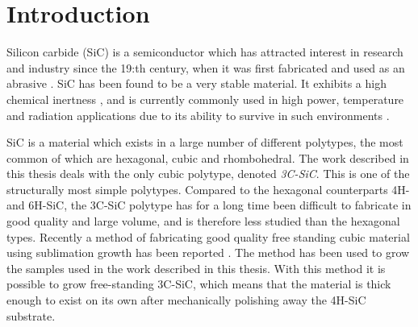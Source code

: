 
\chapter{Introduction}






Silicon carbide (SiC) is a semiconductor which has attracted interest in research and industry since the 19:th century, when it was first fabricated and used as an abrasive \cite{Acheson1893}. SiC has been found to be a very stable material. It exhibits a high chemical inertness \cite{Hume1941}, and is currently commonly used in high power, temperature and radiation applications due to its ability to survive in such environments \cite{J.B.CASADYandR.W.JOHNSON1996}. 

SiC is a material which exists in a large number of different polytypes, the most common of which are hexagonal, cubic and rhombohedral. The work described in this thesis deals with the only cubic polytype, denoted \emph{3C-SiC}. This is one of the structurally most simple polytypes. Compared to the hexagonal counterparts 4H- and 6H-SiC, the 3C-SiC polytype has for a long time been difficult to fabricate in good quality and large volume, and is therefore less studied than the hexagonal types. Recently a method of fabricating good quality free standing cubic material using sublimation growth has been reported \cite{Jokubavicius2014}. The method has been used to grow the samples used in the work described in this thesis. With this method it is possible to grow free-standing 3C-SiC, which means that the material is thick enough to exist on its own after mechanically polishing away the 4H-SiC substrate. 

